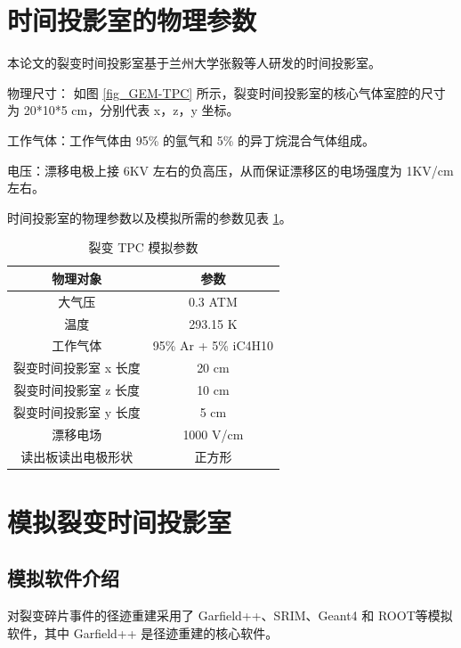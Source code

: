 \documentclass[AutoFakeBold]{LZUThesis}
\begin{document}
\section{时间投影室的物理参数}
本论文的裂变时间投影室基于兰州大学张毅等人研发的时间投影室\cite{魏康2019基于GEM工艺的裂变时间投影室中裂变碎片的讨论}。

物理尺寸：
如图 \ref{fig_GEM-TPC} 所示，裂变时间投影室的核心气体室腔的尺寸为 20*10*5 cm，分别代表 x，z，y 坐标。

工作气体：工作气体由 95\% 的氩气和 5\% 的异丁烷混合气体组成\cite{魏康2019基于GEM工艺的裂变时间投影室中裂变碎片的讨论}。

电压：漂移电极上接 6KV 左右的负高压，从而保证漂移区的电场强度为 1KV/cm 左右。

时间投影室的物理参数以及模拟所需的参数见表 \ref{tbl_TPC_parameters}。

\begin{table}[H]
    \centering
    \caption{裂变 TPC 模拟参数}
    \begin{tabular}{cc} %
    \toprule
    物理对象& 参数 \\
    \midrule
    大气压 & 0.3 ATM \\
    温度 & 293.15 K \\
    工作气体 & 95\% Ar + 5\% iC4H10 \\
    裂变时间投影室 x 长度 & 20 cm \\
    裂变时间投影室 z 长度 & 10 cm \\
    裂变时间投影室 y 长度 & 5 cm \\
    漂移电场 & 1000 V/cm \\
    读出板读出电极形状 & 正方形 \\
    \bottomrule
    \end{tabular}
    \label{tbl_TPC_parameters}
\end{table}







\section{模拟裂变时间投影室}
\subsection{模拟软件介绍}
对裂变碎片事件的径迹重建采用了 Garfield++、SRIM、Geant4 和 ROOT等模拟软件，其中 Garfield++ 是径迹重建的核心软件。
\end{document}
